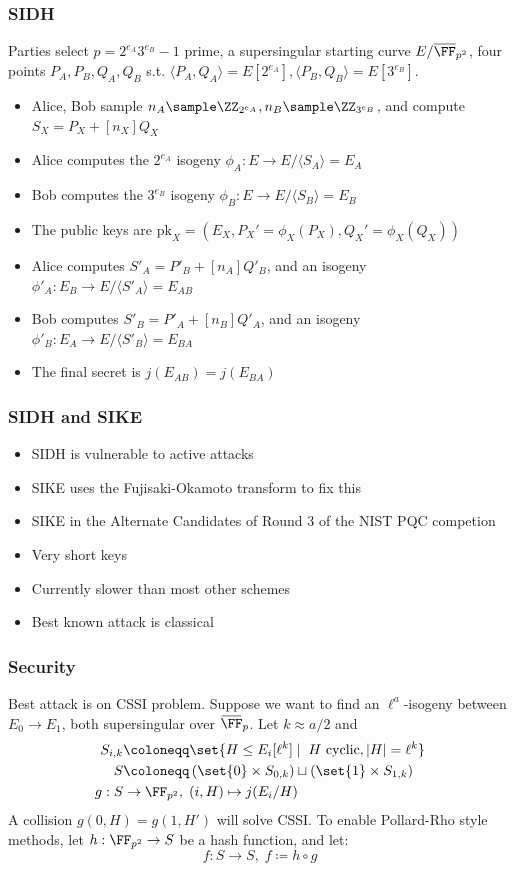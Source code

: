 \documentclass{beamer}
\newcommand{\overbar}[1]{\mkern 1.5mu\overline{\mkern-1.5mu#1\mkern-1.5mu}\mkern 1.5mu}
\begin{document}
\begin{frame}
    \frametitle{SIDH}
    Parties select $p = 2^{e_A} 3^{e_B} - 1$ prime, a supersingular starting curve $E/\overline{\FF}_{p^2}$, four points $P_A, P_B, Q_A, Q_B$ s.t.
    $\langle P_A, Q_A \rangle = E[2^{e_A}], \langle P_B, Q_B \rangle = E[3^{e_B}]$.
    \begin{itemize}
        \item Alice, Bob sample $n_A \sample \ZZ_{2^{e_A}}, n_B \sample \ZZ_{3^{e_B}}$, and compute $S_{X} = P_X + [n_X]Q_X$
        \item Alice computes the $2^{e_A}$ isogeny $\phi_A: E \to E/\langle S_A\rangle = E_A$
        \item Bob computes the $3^{e_B}$ isogeny $\phi_B: E \to E/\langle S_B\rangle = E_B$
        \item The public keys are $\mathrm{pk}_X = \left(E_X, P_X' = \phi_X(P_X), Q_X' = \phi_X(Q_X)\right)$
        \item Alice computes $S'_A = P'_B + [n_A] Q'_B$, and an isogeny $\phi'_A : E_B \to E/\langle S'_A \rangle = E_{AB}$
        \item Bob computes $S'_B = P'_A + [n_B] Q'_A$, and an isogeny $\phi'_B : E_A \to E/\langle S'_B \rangle = E_{BA}$
        \item The final secret is $j(E_{AB}) = j(E_{BA})$
    \end{itemize}
\end{frame}

\begin{frame}
    \frametitle{SIDH and SIKE}
    \begin{itemize}
        \item SIDH is vulnerable to active attacks
        \item SIKE uses the Fujisaki-Okamoto transform to fix this 
        \item SIKE in the Alternate Candidates of Round 3 of the NIST PQC competion
        \item Very short keys
        \item Currently slower than most other schemes
        \item Best known attack is classical
    \end{itemize} 
\end{frame}

\begin{frame}
    \frametitle{Security}
    Best attack is on CSSI problem. Suppose we want to find an $\ell^a$-isogeny  between $E_0 \to E_1$, both 
    supersingular over $\overbar{\FF}_p$. Let $k \approx a/2$ and
    \begin{align*}
        S_{i, k} &\coloneqq \set{ H \leq E_i[\ell^k] \mid \; H \text{ cyclic}, |H| = \ell^k } \\
        S &\coloneqq \left( \set{0} \times S_{0, k} \right) \sqcup \left( \set{1} \times S_{1, k} \right) \\
        g: S &\to \FF_{p^2}, \; (i, H) \mapsto j(E_{i}/H)
    \end{align*}
    A collision $g(0, H) = g(1, H')$ will solve CSSI. To enable Pollard-Rho style methods, let $h: \FF_{p^2} \to S$ 
    be a hash function, and let:
    \[ f: S \to S,\; f \coloneqq h \circ g \]
\end{frame}
\end{document}
